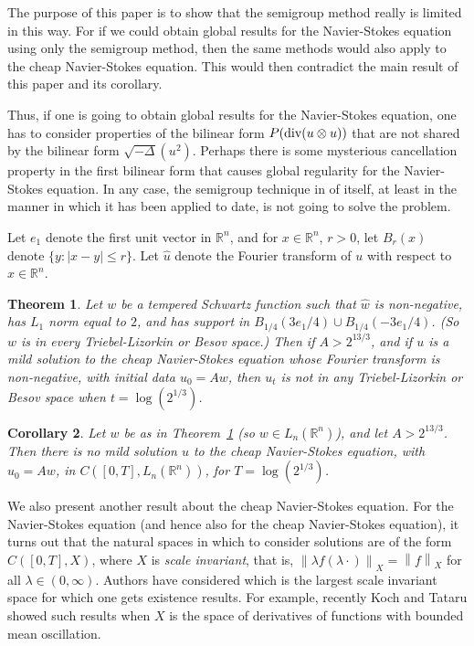 \documentclass[12pt]{amsart}
\newtheorem{thm}{Theorem}
\newtheorem{cor}[thm]{Corollary}
\newcommand{\R}{{\mathbb R}}
\newcommand{\modo}[1]{{\left|#1\right|}}
\newcommand{\normo}[1]{{\left\|#1\right\|}}
\renewcommand{\div}{\text{\rm div}}
\begin{document}
The purpose of this paper is to show that the semigroup method really is
limited in this way.  For if we could obtain
global results for the Navier-Stokes equation using only the semigroup
method, then the same methods would also
apply to the cheap Navier-Stokes equation.
This would then contradict the main result of this paper and its corollary.

Thus, if one is going to obtain global results for the Navier-Stokes
equation, one has to consider properties of the bilinear form
$P(\div(u \otimes u))$ that are not shared by the bilinear form
$\sqrt{-\Delta} (u^2)$.  Perhaps there is some mysterious cancellation
property in the first bilinear form that causes global regularity for
the Navier-Stokes equation.  In any case, the semigroup technique in
of itself, at least in the manner in which it has been applied to date,
is not going to solve the problem.

Let $e_1$ denote the first unit vector in $\R^n$, and for $x \in \R^n$,
$r>0$, let $B_r(x)$ denote $\{y:\modo{x-y}\le r\}$.
Let $\hat u$ denote the Fourier transform of $u$ with
respect to $x\in\R^n$.  

\begin{thm}
\label{blow-up}
Let $w$ be a tempered Schwartz function such that $\hat w$
is non-negative, has $L_1$ norm equal to $2$, and has support in 
$B_{1/4}(3e_1/4) \cup B_{1/4}(-3e_1/4)$.  (So $w$ is in every
Triebel-Lizorkin or Besov space.)
Then if $A > 2^{13/3}$, and if $u$ is a mild solution
to the cheap Navier-Stokes equation
whose Fourier transform is non-negative, with initial data $u_0 = A w$, 
then $u_t$
is not in any Triebel-Lizorkin or Besov space when $t = \log(2^{1/3})$.
\end{thm}

\begin{cor}
\label{no-Ln}
Let $w$ be as in Theorem~\ref{blow-up} (so $w \in L_n(\R^n)$), and let
$A > 2^{13/3}$.  Then there is 
no mild solution $u$ to the cheap 
Navier-Stokes equation, with $u_0=Aw$,
in $C([0,T],L_n(\R^n))$, for $T = \log(2^{1/3})$.
\end{cor}

We also present another result about the 
cheap Navier-Stokes
equation.  For the Navier-Stokes equation (and hence also for the
cheap Navier-Stokes equation), it turns out that the natural spaces
in which to consider solutions are of the form $C([0,T],X)$, where $X$
is {\em scale invariant}, that is,
$ \normo{\lambda f(\lambda \cdot)}_X = \normo f_X $
for all $\lambda \in (0,\infty)$.
Authors have considered which is the
largest scale invariant space for which one gets existence
results.  For example, recently Koch and Tataru \cite{KT} showed such
results when $X$ is the space of derivatives of functions with
bounded mean oscillation.
\end{document}
